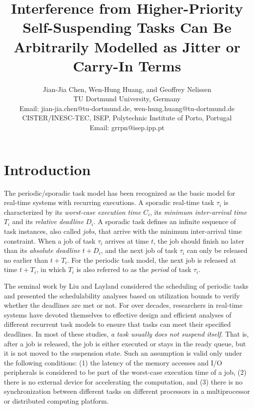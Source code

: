 \documentclass[10pt,conference,preprint]{IEEEtran}
\begin{document}
\title{\LARGE Interference from Higher-Priority Self-Suspending Tasks Can Be
  Arbitrarily Modelled as Jitter or Carry-In Terms}

\author{Jian-Jia Chen, Wen-Hung Huang, and Geoffrey Nelissen\\
TU Dortmund University, Germany\\
Email: jian-jia.chen@tu-dortmund.de, wen-hung.huang@tu-dortmund.de\\
CISTER/INESC-TEC, ISEP, Polytechnic Institute of Porto, Portugal \\
Email: grrpn@isep.ipp.pt
}

\maketitle

\begin{abstract}
  
\end{abstract}

\section{Introduction}

The periodic/sporadic task model has been recognized as the basic
model for real-time systems with recurring executions.  A sporadic
real-time task $\tau_i$ is characterized by its \emph{worst-case execution
time} $C_i$, its \emph{minimum
  inter-arrival time} $T_i$ and its
\emph{relative deadline} $D_i$. A sporadic task defines an infinite
sequence of task instances, also called \emph{jobs}, that arrive with
the minimum inter-arrival time constraint. When a job of task $\tau_i$
arrives at time $t$, the job should finish no later than its
\emph{absolute deadline} $t+D_i$, and the next job of task $\tau_i$
can only be released no earlier than $t+T_i$. For the periodic task
model, the next job is released at time $t+T_i$, in which $T_i$ is
also referred to as the \emph{period} of task $\tau_i$.


The seminal work by Liu and Layland \cite{Liu_1973} considered the
scheduling of periodic tasks and presented the schedulability analyses
based on utilization bounds to verify whether the deadlines are met or
not.  For over decades, researchers in real-time systems have
devoted themselves to effective design and efficient analyses of
different recurrent task models to ensure that tasks can meet their
specified deadlines. In most of these studies, \emph{a task usually does not
 suspend itself}. That is, after a job is released, the job
is either executed or stays in the ready queue, but it is not moved to
the suspension state.  Such an assumption is valid only under the
following conditions: (1) the latency of the memory accesses and I/O
peripherals is considered to be part of the worst-case execution time
of a job, (2) there is no external device for accelerating the
computation, and (3) there is no synchronization between different
tasks on different processors in a multiprocessor or distributed
computing platform.
\end{document}
